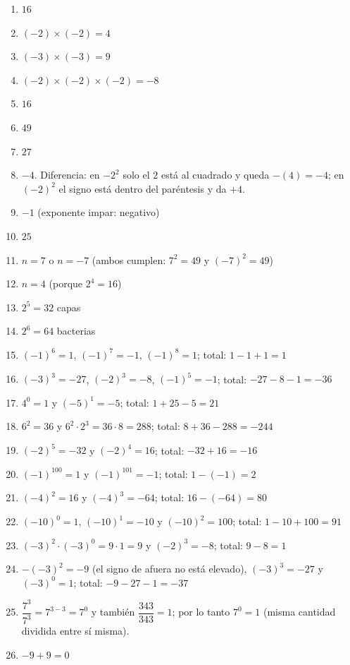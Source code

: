 \documentclass[12pt, letterpaper]{article}
\begin{document}
\begin{enumerate}[leftmargin=*, label=\textbf{\arabic*.}]
  \item $16$
  \item $(-2) \times (-2) = 4$
  \item $(-3) \times (-3) = 9$
  \item $(-2) \times (-2) \times (-2) = -8$
  \item $16$
  \item $49$
  \item $27$
  \item $-4$. Diferencia: en $-2^2$ solo el $2$ está al cuadrado y queda $-(4) = -4$; en $(-2)^2$ el signo está dentro del paréntesis y da $+4$.
  \item $-1$ (exponente impar: negativo)
  \item $25$
  \item $n = 7$ o $n = -7$ (ambos cumplen: $7^2 = 49$ y $(-7)^2 = 49$)
  \item $n = 4$ (porque $2^4 = 16$)
  \item $2^5 = 32$ capas
  \item $2^6 = 64$ bacterias
  \item $(-1)^6 = 1$, $(-1)^7 = -1$, $(-1)^8 = 1$; total: $1 - 1 + 1 = 1$
  \item $(-3)^3 = -27$, $(-2)^3 = -8$, $(-1)^5 = -1$; total: $-27 - 8 - 1 = -36$
  \item $4^0 = 1$ y $(-5)^1 = -5$; total: $1 + 25 - 5 = 21$
  \item $6^2 = 36$ y $6^2 \cdot 2^3 = 36 \cdot 8 = 288$; total: $8 + 36 - 288 = -244$
  \item $(-2)^5 = -32$ y $(-2)^4 = 16$; total: $-32 + 16 = -16$
  \item $(-1)^{100} = 1$ y $(-1)^{101} = -1$; total: $1 - (-1) = 2$
  \item $(-4)^2 = 16$ y $(-4)^3 = -64$; total: $16 - (-64) = 80$
  \item $(-10)^0 = 1$, $(-10)^1 = -10$ y $(-10)^2 = 100$; total: $1 - 10 + 100 = 91$
  \item $(-3)^2 \cdot (-3)^0 = 9 \cdot 1 = 9$ y $(-2)^3 = -8$; total: $9 - 8 = 1$
  \item $-(-3)^2 = -9$ (el signo de afuera no está elevado), $(-3)^3 = -27$ y $(-3)^0 = 1$; total: $-9 - 27 - 1 = -37$
  \item $\dfrac{7^3}{7^3} = 7^{3-3} = 7^0$ y también $\dfrac{343}{343} = 1$; por lo tanto $7^0 = 1$ (misma cantidad dividida entre sí misma).
  \item $-9 + 9 = 0$

\end{enumerate}
\end{document}
